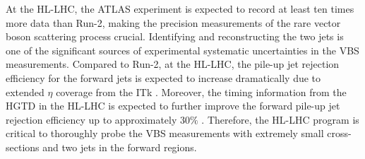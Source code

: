 At the HL-LHC, the ATLAS experiment is expected to record at least ten times more data than Run-2, making the precision measurements of the rare vector boson scattering process crucial. Identifying and reconstructing the two jets is one of the significant sources of experimental systematic uncertainties in the VBS measurements. Compared to Run-2, at the HL-LHC, the pile-up jet rejection efficiency for the forward jets is expected to increase dramatically due to extended $\eta$ coverage from the ITk \cite{HLLHC_JetTrack}. Moreover, the timing information from the HGTD in the HL-LHC is expected to further improve the forward pile-up jet rejection efficiency up to approximately $30\%$ \cite{HLLHC_HGTD}. Therefore, the HL-LHC program is critical to thoroughly probe the VBS measurements with extremely small cross-sections and two jets in the forward regions.
